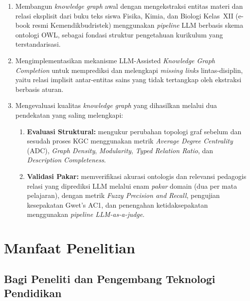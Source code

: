 \documentclass[main]{subfiles}
\begin{document}
\begin{enumerate}
  \item Membangun \textit{knowledge graph} awal dengan mengekstraksi entitas
        materi dan relasi eksplisit dari buku teks siswa Fisika, Kimia, dan
        Biologi Kelas~XII (e-book resmi Kemendikbudristek) menggunakan
        \textit{pipeline} LLM berbasis skema ontologi OWL, sebagai fondasi
        struktur pengetahuan kurikulum yang terstandarisasi.

  \item Mengimplementasikan mekanisme LLM-Assisted \textit{Knowledge Graph
        Completion} untuk memprediksi dan
        melengkapi \textit{missing links} lintas-disiplin, yaitu relasi implisit
        antar-entitas sains yang tidak tertangkap oleh ekstraksi berbasis aturan.

  \item Mengevaluasi kualitas \textit{knowledge graph} yang dihasilkan melalui
        dua pendekatan yang saling melengkapi:
        \begin{enumerate}
          \item \textbf{Evaluasi Struktural:} mengukur perubahan topologi graf
                sebelum dan sesudah proses KGC menggunakan metrik
                \textit{Average Degree Centrality} (ADC),
                \textit{Graph Density}, \textit{Modularity},
                \textit{Typed Relation Ratio}, dan
                \textit{Description Completeness}.

          \item \textbf{Validasi Pakar:} memverifikasi akurasi ontologis dan
                relevansi pedagogis relasi yang diprediksi LLM melalui enam
                \textit{pakar} domain (dua per mata pelajaran), dengan metrik
                \textit{Fuzzy Precision and Recall},
                pengujian kesepakatan Gwet's AC1, dan penengahan ketidaksepakatan
                menggunakan \textit{pipeline LLM-as-a-judge}.
        \end{enumerate}
\end{enumerate}

\section{Manfaat Penelitian}

\subsection{Bagi Peneliti dan Pengembang Teknologi Pendidikan}
\end{document}
